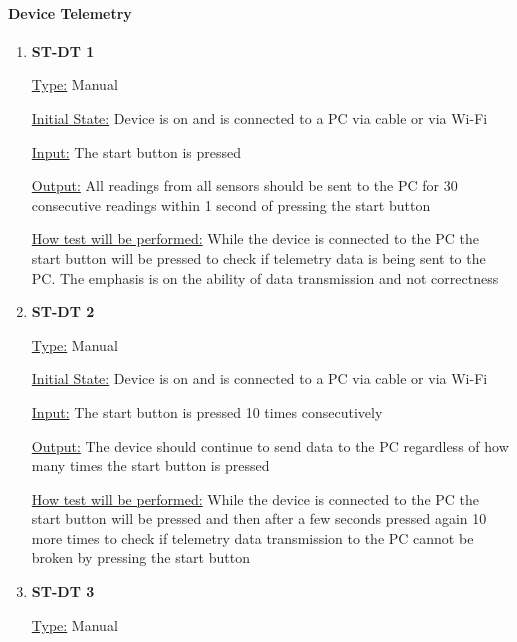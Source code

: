 \documentclass[12pt, titlepage]{article}
\begin{document}
\paragraph{Device Telemetry}	
\begin{enumerate}

  \item{\bf{ST-DT 1}}
  
  \underline{Type:} Manual
            
  \underline{Initial State:} Device is on and is connected to a PC via cable or via Wi-Fi
            
  \underline{Input:} The start button is pressed
            
  \underline{Output:} All readings from all sensors should be sent to the PC for 30 consecutive readings within 1 second of pressing the start button
  
            
  \underline{How test will be performed:} While the device is connected to the PC the start button will be pressed to check if telemetry data is being sent to the PC. The emphasis is on the ability of data transmission and not correctness\\

  \item{\bf{ST-DT 2}}
  
  \underline{Type:} Manual
            
  \underline{Initial State:} Device is on and is connected to a PC via cable or via Wi-Fi
            
  \underline{Input:} The start button is pressed 10 times consecutively
            
  \underline{Output:} The device should continue to send data to the PC regardless of how many times the start button is pressed
  
            
  \underline{ How test will be performed:} While the device is connected to the PC the start button will be pressed and then after a few seconds pressed again 10 more times to check if telemetry data transmission to the PC cannot be broken by pressing the start button\\

  \item{\bf{ST-DT 3}}
  
  \underline{Type:} Manual
            

\end{enumerate}
\end{document}
